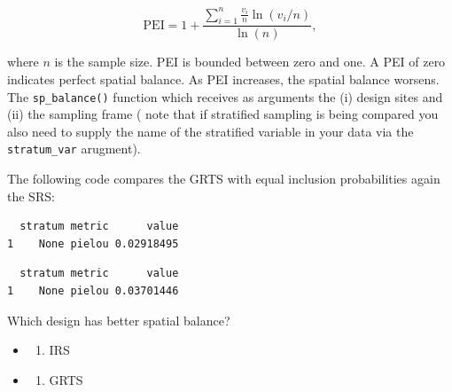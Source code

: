 \documentclass[
  letterpaper,
  DIV=11,
  numbers=noendperiod]{scrartcl}
\newenvironment{Shaded}{\begin{snugshade}}{\end{snugshade}}
\newcommand{\FunctionTok}[1]{\textcolor[rgb]{0.28,0.35,0.67}{#1}}
\newcommand{\NormalTok}[1]{\textcolor[rgb]{0.00,0.23,0.31}{#1}}
\newcommand{\SpecialCharTok}[1]{\textcolor[rgb]{0.37,0.37,0.37}{#1}}
\providecommand{\tightlist}{%
  \setlength{\itemsep}{0pt}\setlength{\parskip}{0pt}}\usepackage{longtable,booktabs,array}
\begin{document}
\[
\text{PEI} = 1 + \frac{\sum_{i=1}^{n} \frac{v_i}{n} \ln(v_i/n)}{\ln(n)},
\]

where \(n\) is the sample size. PEI is bounded between zero and one. A
PEI of zero indicates perfect spatial balance. As PEI increases, the
spatial balance worsens. The \texttt{sp\_balance()} function which
receives as arguments the (i) design sites and (ii) the sampling frame (
note that if stratified sampling is being compared you also need to
supply the name of the stratified variable in your data via the
\texttt{stratum\_var} arugment).

The following code compares the GRTS with equal inclusion probabilities
again the SRS:

\begin{Shaded}
\end{Shaded}

\begin{verbatim}
  stratum metric      value
1    None pielou 0.02918495
\end{verbatim}

\begin{Shaded}
\end{Shaded}

\begin{verbatim}
  stratum metric      value
1    None pielou 0.03701446
\end{verbatim}

\begin{tcolorbox}[enhanced jigsaw, colbacktitle=quarto-callout-tip-color!10!white, toprule=.15mm, breakable, coltitle=black, opacityback=0, toptitle=1mm, arc=.35mm, titlerule=0mm, bottomtitle=1mm, title={Question}, rightrule=.15mm, bottomrule=.15mm, colback=white, colframe=quarto-callout-tip-color-frame, opacitybacktitle=0.6, left=2mm, leftrule=.75mm]

Which design has better spatial balance?

\begin{itemize}
\tightlist
\item
  \begin{enumerate}
  \def\labelenumi{(\Alph{enumi})}
  \tightlist
  \item
    IRS\\
  \end{enumerate}
\item
  \begin{enumerate}
  \def\labelenumi{(\Alph{enumi})}
  \setcounter{enumi}{1}
  \tightlist
  \item
    GRTS
  \end{enumerate}
\end{itemize}

\end{tcolorbox}
\end{document}
